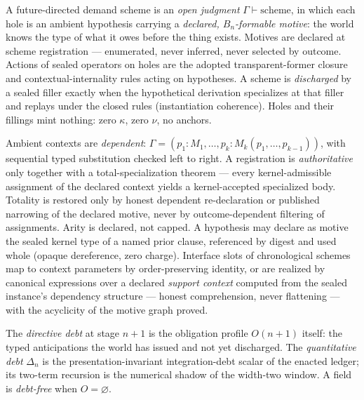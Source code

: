 \begin{definition}
\label{def:future-holes}
A future-directed demand scheme is an \emph{open judgment}
\(\Gamma \vdash \mathrm{scheme}\), in which each hole is an ambient hypothesis
carrying a \emph{declared, \(B_n\)-formable motive}: the world knows the type
of what it owes before the thing exists. Motives are declared at scheme
registration --- enumerated, never inferred, never selected by outcome.
Actions of sealed operators on holes are the adopted transparent-former
closure and contextual-internality rules acting on hypotheses. A scheme is
\emph{discharged} by a sealed filler exactly when the hypothetical derivation
specializes at that filler and replays under the closed rules (instantiation
coherence). Holes and their fillings mint nothing: zero \(\kappa\), zero
\(\nu\), no anchors.

Ambient contexts are \emph{dependent}: \(\Gamma =
(p_1{:}M_1,\dots,p_k{:}M_k(p_1,\dots,p_{k-1}))\), with sequential typed
substitution checked left to right. A registration is \emph{authoritative}
only together with a total-specialization theorem --- every kernel-admissible
assignment of the declared context yields a kernel-accepted specialized body.
Totality is restored only by honest dependent re-declaration or published
narrowing of the declared motive, never by outcome-dependent filtering of
assignments. Arity is declared, not capped. A hypothesis may declare as
motive the sealed kernel type of a named prior clause, referenced by digest
and used whole (opaque dereference, zero charge). Interface slots of
chronological schemes map to context parameters by order-preserving identity,
or are realized by canonical expressions over a declared \emph{support
context} computed from the sealed instance's dependency structure ---
honest comprehension, never flattening --- with the acyclicity of the motive
graph proved.
\end{definition}

\begin{definition}
The \emph{directive debt} at stage \(n+1\) is the obligation profile
\(O(n+1)\) itself: the typed anticipations the world has issued and not yet
discharged. The \emph{quantitative debt} \(\Delta_n\) is the
presentation-invariant integration-debt scalar of the enacted ledger; its
two-term recursion is the numerical shadow of the width-two window. A field is
\emph{debt-free} when \(O = \varnothing\).
\end{definition}

